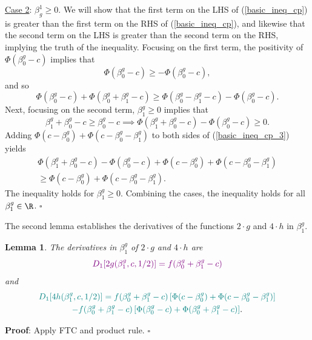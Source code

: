 \documentclass[12pt]{article}
\newtheorem{lemma}{Lemma}
\begin{document}
\noindent
\underline{Case 2}: $\beta^1_g \geq 0.$  We will show that the first term on the LHS of (\ref{basic_ineq_cp}) is greater than the first term on the RHS of (\ref{basic_ineq_cp}), and likewise that the second term on the LHS is greater than the second term on the RHS, implying the truth of the inequality. Focusing on the first term, the positivity of $\Phi(\beta^g_0 -c)$ implies that
$$ \Phi(\beta^g_0 - c) \geq - \Phi(\beta^g_0 - c),$$ and so
$$ \Phi(\beta^g_0 - c) + \Phi(\beta^g_0 + \beta^g_1 - c) \geq \Phi(\beta^g_0 - \beta^g_1 - c) - \Phi(\beta^g_0 - c).$$
Next, focusing on the second term, $\beta^g_1 \geq 0$ implies that 
\begin{equation}\label{basic_ineq_cp_3}
\beta^g_1 + \beta^g_0 - c \geq \beta^g_0 - c \implies \Phi(\beta^g_1 + \beta^g_0 - c) - \Phi(\beta^g_0 - c) \geq 0.
\end{equation}
Adding $\Phi(c - \beta^g_0) + \Phi(c - \beta^g_0 - \beta^g_1)$ to both sides of (\ref{basic_ineq_cp_3}) yields
\begin{multline*}
\Phi(\beta^g_1 + \beta^g_0 - c) - \Phi(\beta^g_0 - c) + \Phi(c - \beta^g_0) + \Phi(c - \beta^g_0 - \beta^g_1) \\ \geq \Phi(c - \beta^g_0) + \Phi(c - \beta^g_0 - \beta^g_1). \textrm{ }
\end{multline*}
The inequality holds for $\beta^g_1 \geq 0$. Combining the cases, the inequality holds for all $\beta^g_1 \in \R$. $\square$

The second lemma establishes the derivatives of the functions $2\cdot g$ and $4 \cdot h$ in $\beta^g_1$.
\begin{lemma}
The derivatives in $\beta^g_1$ of $2\cdot g$ and $4\cdot h$ are
\begin{equation}\label{dg_dbeta}
\textcolor{violet}{D_1[2g(\beta^g_1, c, 1/2)] = f(\beta^g_0 + \beta^g_1 - c)}
\end{equation}
and
\begin{multline}\label{dh_dbeta}
\textcolor{teal}{D_1[4h(\beta^g_1, c, 1/2)] = f(\beta^g_0 + \beta^g_1 - c) \left[\Phi(c - \beta^g_0) + \Phi(c - \beta_0^g - \beta_1^g) \right]} \\ \textcolor{teal}{- f(\beta^g_0 + \beta^g_1 - c) \left[\Phi(\beta_0^g - c) + \Phi(\beta^g_0 + \beta^g_1 - c) \right]}.\end{multline}
\end{lemma}
\textbf{Proof}: Apply FTC and product rule. $\square$
\end{document}

